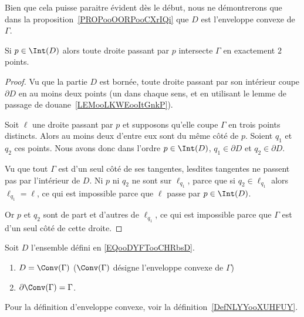 \begin{remark}
	Bien que cela puisse paraitre évident dès le début, nous ne démontrerons que dans la proposition~\ref{PROPooOORPooCXrIQi} que \( D\) est l'enveloppe convexe de \( \Gamma\).
\end{remark}

\begin{corollary}       \label{CORooSXDGooJEmVcf}
	Si \( p\in\Int(D)\) alors toute droite passant par \( p\) intersecte \( \Gamma\) en exactement \( 2\) points.
\end{corollary}

\begin{proof}
	Vu que la partie \( D\) est bornée, toute droite passant par son intérieur coupe \( \partial D\) en au moins deux points (un dans chaque sens, et en utilisant le lemme de passage de douane~\ref{LEMooLKWEooItGnkP}).

	Soit \( \ell\) une droite passant par \( p\) et supposons qu'elle coupe \( \Gamma\) en trois points distincts. Alors au moins deux d'entre eux sont du même côté de \( p\). Soient \( q_1\) et \( q_2\) ces points. Nous avons donc dans l'ordre \( p\in \Int(D)\), \( q_1\in\partial D\) et \( q_2\in \partial D\).

	Vu que tout \( \Gamma\) est d'un seul côté de ses tangentes, lesdites tangentes ne passent pas par l'intérieur de \( D\). Ni \( p\) ni \( q_2\) ne sont sur \( \ell_{q_1}\), parce que si \( q_2\in\ell_{q_1}\) alors \( \ell_{q_1}=\ell\), ce qui est impossible parce que \( \ell\) passe par \( p\in\Int(D)\).

	Or \( p\) et \( q_2\) sont de part et d'autres de \( \ell_{q_1}\), ce qui est impossible parce que \( \Gamma\) est d'un seul côté de cette droite.
\end{proof}

\begin{proposition}     \label{PROPooOORPooCXrIQi}
	Soit \( D\) l'ensemble défini en \eqref{EQooDYFTooCHRbsD}.
	\begin{enumerate}
		\item
		      \( D=\Conv(\Gamma)\) (\( \Conv(\Gamma)\) désigne l'enveloppe convexe de \( \Gamma\))
		\item
		      \( \partial\Conv(\Gamma)=\Gamma\).
	\end{enumerate}
	Pour la définition d'enveloppe convexe, voir la définition~\ref{DefNLYYooXUHFUY}.
\end{proposition}

